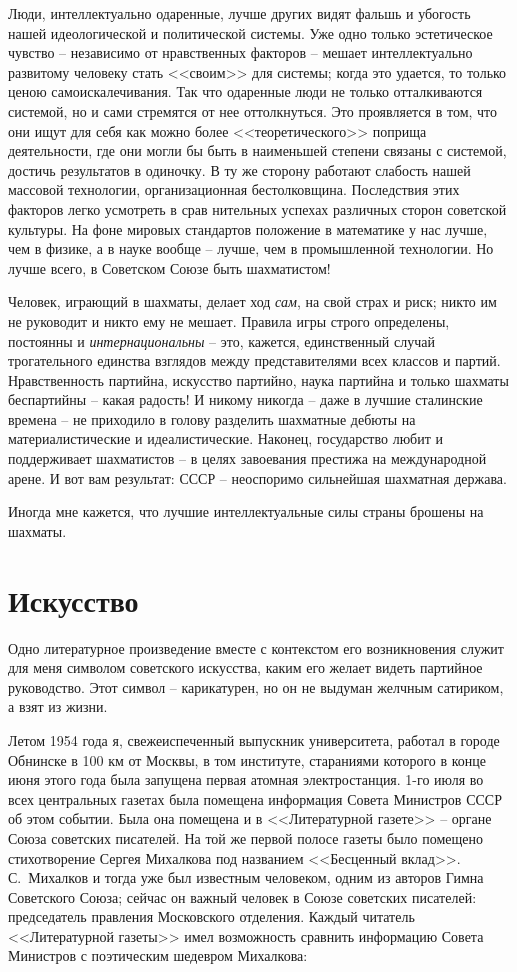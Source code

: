 \documentclass{book}
\begin{document}
Люди, интеллектуально одаренные, лучше других видят фальшь и убогость нашей идеологической и политической системы. Уже одно 
только эстетическое чувство -- независимо от нравственных факторов -- мешает интеллектуально развитому человеку стать <<своим>> 
для системы; когда это удается, то только ценою самоискалечивания. Так что одаренные люди не только отталкиваются системой, но и 
сами стремятся от нее оттолкнуться. Это проявляется в том, что они ищут для себя как можно более <<теоретического>> поприща 
деятельности, где они могли бы быть в наименьшей степени связаны с систе­мой, достичь результатов в одиночку. В ту же сторону 
работают слабость нашей массовой технологии, организационная бестолковщина. Последствия этих факторов легко усмотреть в срав­
нительных успехах различных сторон советской культуры. На фоне мировых стандартов положение в математике у нас лучше, чем в 
физике, а в науке вообще -- лучше, чем в промыш­ленной технологии. Но лучше всего, в Советском Союзе быть шахматистом!

Человек, играющий в шахматы, делает ход \textit{сам},  на свой страх и риск; никто им не руководит и никто ему не мешает. 
Правила игры строго определены, постоянны и \textit{интернациональны} --  это, кажется, единственный случай трогательного единства 
взглядов между представителями всех классов и партий. Нравственность партийна, искусство партийно, наука партийна и только 
шахматы беспартийны -- какая радость! И никому никогда -- даже в лучшие сталинские времена -- не приходило в голову разделить 
шахматные дебюты на материалистические и идеалистические. Наконец, государство любит и поддерживает шахматистов -- в целях 
завоевания престижа на международной арене. И вот вам результат: СССР -- неоспоримо сильнейшая шахматная держава.

Иногда мне кажется, что лучшие интеллектуальные силы страны брошены на шахматы.


\section{Искусство}

Одно литературное произведение вместе с контекстом его возникновения служит для меня символом советского искусства, каким его 
желает видеть партийное руководство. Этот символ -- карикатурен, но он не выдуман желчным сатириком, а взят из жизни.

Летом 1954 года я, свежеиспеченный выпускник университета, работал в городе Обнинске в 100 км от Москвы, в том институте, 
стараниями которого в конце июня этого года была запущена первая атомная электростанция. 1-го июля во всех центральных газетах 
была помещена информация Совета Министров СССР об этом событии. Была она помещена и в <<Литературной газете>> -- органе Союза 
советских писателей. На той же первой полосе газеты было помещено стихотворение Сер­гея Михалкова под названием <<Бесценный 
вклад>>. С.~Михалков и тогда уже был известным человеком, одним из авторов Гимна Советского Союза; сейчас он важный человек в 
Союзе советских писателей: председатель правления Московского отделения. Каждый читатель <<Литературной газеты>> имел возможность сравнить информацию Совета Министров с поэтическим шедевром Михалкова:
\end{document}
